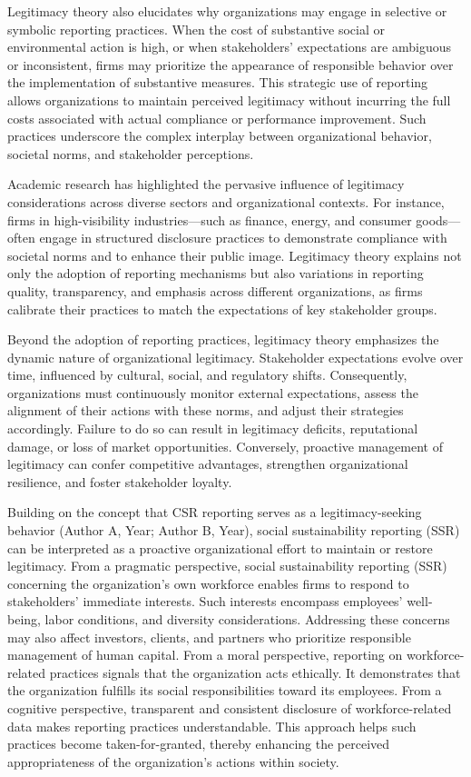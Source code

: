 Legitimacy theory also elucidates why organizations may engage in selective or symbolic reporting practices. 
When the cost of substantive social or environmental action is high, or when stakeholders’ expectations are 
ambiguous or inconsistent, firms may prioritize the appearance of responsible behavior over the implementation 
of substantive measures. This strategic use of reporting allows organizations to maintain perceived legitimacy 
without incurring the full costs associated with actual compliance or performance improvement. Such practices 
underscore the complex interplay between organizational behavior, societal norms, and stakeholder perceptions.

Academic research has highlighted the pervasive influence of legitimacy considerations across diverse sectors 
and organizational contexts. For instance, firms in high-visibility industries—such as finance, energy, and 
consumer goods—often engage in structured disclosure practices to demonstrate compliance with societal norms 
and to enhance their public image. Legitimacy theory explains not only the adoption of reporting mechanisms 
but also variations in reporting quality, transparency, and emphasis across different organizations, as firms 
calibrate their practices to match the expectations of key stakeholder groups.

Beyond the adoption of reporting practices, legitimacy theory emphasizes the dynamic nature of organizational 
legitimacy. Stakeholder expectations evolve over time, influenced by cultural, social, and regulatory shifts.
Consequently, organizations must continuously monitor external expectations, assess the alignment of their actions 
with these norms, and adjust their strategies accordingly. Failure to do so can result in legitimacy deficits, 
reputational damage, or loss of market opportunities. Conversely, proactive management of legitimacy can confer 
competitive advantages, strengthen organizational resilience, and foster stakeholder loyalty.




Building on the concept that CSR reporting serves as a legitimacy-seeking behavior (Author A, Year; Author B, Year), 
social sustainability reporting (SSR) can be interpreted as a proactive organizational effort to maintain or restore legitimacy.
From a pragmatic perspective, social sustainability reporting (SSR) concerning the organization's own workforce enables firms 
to respond to stakeholders' immediate interests. Such interests encompass employees' well-being, labor conditions, and diversity
considerations. Addressing these concerns may also affect investors, clients, and partners who prioritize responsible management 
of human capital. From a moral perspective, reporting on workforce-related practices signals that the organization acts ethically. 
It demonstrates that the organization fulfills its social responsibilities toward its employees.
From a cognitive perspective, transparent and consistent disclosure of workforce-related data makes reporting practices 
understandable. This approach helps such practices become taken-for-granted, thereby enhancing the perceived appropriateness 
of the organization's actions within society.


